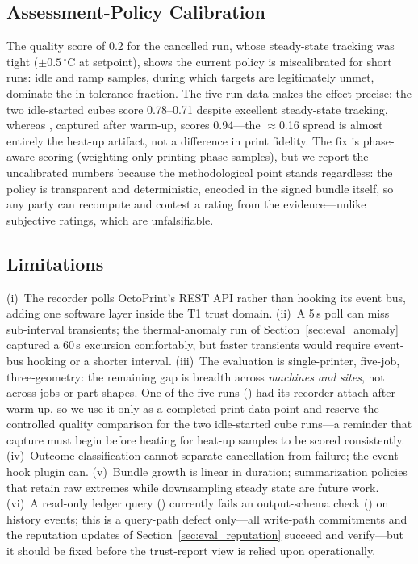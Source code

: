 \subsection{Assessment-Policy Calibration}

The quality score of 0.2 for the cancelled run, whose steady-state
tracking was tight ($\pm 0.5\,^{\circ}$C at setpoint), shows the current
policy is miscalibrated for short runs: idle and ramp samples, during which
targets are legitimately unmet, dominate the in-tolerance fraction.  The
five-run data makes the effect precise: the two idle-started cubes score
0.78--0.71 despite excellent steady-state tracking, whereas
, captured after warm-up, scores 0.94---the
$\approx$0.16 spread is almost entirely the heat-up artifact, not a
difference in print fidelity.  The fix is phase-aware scoring (weighting
only printing-phase samples), but we report the uncalibrated numbers
because the methodological point stands regardless: the policy is
transparent and deterministic, encoded in the signed bundle itself, so any
party can recompute and contest a rating from the evidence---unlike
subjective ratings, which are unfalsifiable.

\subsection{Limitations}

(i)~The recorder polls OctoPrint's REST API rather than hooking its event
bus, adding one software layer inside the T1 trust domain.  (ii)~A 5\,s
poll can miss sub-interval transients; the thermal-anomaly run of
Section~\ref{sec:eval_anomaly} captured a 60\,s excursion comfortably, but
faster transients would require event-bus hooking or a shorter interval.
(iii)~The evaluation is single-printer, five-job, three-geometry: the
remaining gap is breadth across \emph{machines and sites}, not across jobs
or part shapes.  One of the five runs () had its
recorder attach after warm-up, so we use it only as a completed-print data
point and reserve the controlled quality comparison for the two
idle-started cube runs---a reminder that capture must begin before heating
for heat-up samples to be scored consistently.  (iv)~Outcome
classification cannot separate cancellation from failure; the event-hook
plugin can.  (v)~Bundle growth is linear in duration; summarization
policies that retain raw extremes while downsampling steady state are
future work.  (vi)~A read-only ledger query
() currently fails an output-schema check
() on history events; this is a query-path defect
only---all write-path commitments and the reputation updates of
Section~\ref{sec:eval_reputation} succeed and verify---but it should be
fixed before the trust-report view is relied upon operationally.
